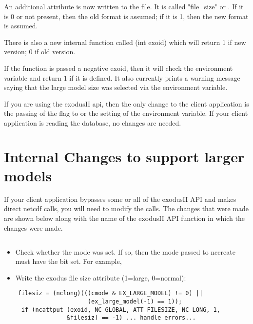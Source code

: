 An additional attribute is now written to the file. It is called
"file_size" or . If it is 0 or not present, then
the old format is assumed; if it is 1, then the new format is assumed.

There is also a new internal function called
(int exoid) which will return 1 if new
version; 0 if old version.

If the function is passed a negative exoid, then it will check the
 environment
variable and return 1 if it is defined. It also currently prints a
warning message saying that the large model size was selected via the
environment variable.

If you are using the exodusII api, then the only change to the client
application is the passing of the  flag to
 or the setting of the
 environment
variable. If your client application is reading the database, no
changes are needed.

\section{Internal Changes to support larger models}
If your client application bypasses some or all of the exodusII API
and makes direct netcdf calls, you will need to modify the calls. The
changes that were made are shown below along with the name of the
exodusII API function in which the changes were made.

\subsection{}
\begin{itemize}
\item Check whether the  mode was set. If so, then the
mode passed to nccreate must have the  bit set. For
example, 

\item Write the exodus file size
 attribute (1=large, 0=normal):
\end{itemize}
\begin{lstlisting}
    filesiz = (nclong)(((cmode & EX_LARGE_MODEL) != 0) || 
                        (ex_large_model(-1) == 1));
     if (ncattput (exoid, NC_GLOBAL, ATT_FILESIZE, NC_LONG, 1,
                  &filesiz) == -1) ... handle errors...
\end{lstlisting}

